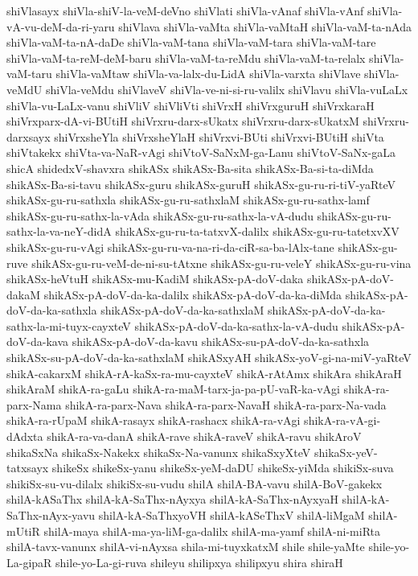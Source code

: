 {shiVlasayx
shiVla-shiV-la-veM-deVno
shiVlati
shiVla-vAnaf
shiVla-vAnf
shiVla-vA-vu-deM-da-ri-yaru
shiVlava
shiVla-vaMta
shiVla-vaMtaH
shiVla-vaM-ta-nAda
shiVla-vaM-ta-nA-daDe
shiVla-vaM-tana
shiVla-vaM-tara
shiVla-vaM-tare
shiVla-vaM-ta-reM-deM-baru
shiVla-vaM-ta-reMdu
shiVla-vaM-ta-relalx
shiVla-vaM-taru
shiVla-vaMtaw
shiVla-va-lalx-du-LidA
shiVla-varxta
shiVlave
shiVla-veMdU
shiVla-veMdu
shiVlaveV
shiVla-ve-ni-si-ru-valilx
shiVlavu
shiVla-vuLaLx
shiVla-vu-LaLx-vanu
shiVliV
shiVliVti
shiVrxH
shiVrxguruH
shiVrxkaraH
shiVrxparx-dA-vi-BUtiH
shiVrxru-darx-sUkatx
shiVrxru-darx-sUkatxM
shiVrxru-darxsayx
shiVrxsheYla
shiVrxsheYlaH
shiVrxvi-BUti
shiVrxvi-BUtiH
shiVta
shiVtakekx
shiVta-va-NaR-vAgi
shiVtoV-SaNxM-ga-Lanu
shiVtoV-SaNx-gaLa
shicA
shidedxV-shavxra
shikASx
shikASx-Ba-sita
shikASx-Ba-si-ta-diMda
shikASx-Ba-si-tavu
shikASx-guru
shikASx-guruH
shikASx-gu-ru-ri-tiV-yaRteV
shikASx-gu-ru-sathxla
shikASx-gu-ru-sathxlaM
shikASx-gu-ru-sathx-lamf
shikASx-gu-ru-sathx-la-vAda
shikASx-gu-ru-sathx-la-vA-dudu
shikASx-gu-ru-sathx-la-va-neY-didA
shikASx-gu-ru-ta-tatxvX-dalilx
shikASx-gu-ru-tatetxvXV
shikASx-gu-ru-vAgi
shikASx-gu-ru-va-na-ri-da-ciR-sa-ba-lAlx-tane
shikASx-gu-ruve
shikASx-gu-ru-veM-de-ni-su-tAtxne
shikASx-gu-ru-veleY
shikASx-gu-ru-vina
shikASx-heVtuH
shikASx-mu-KadiM
shikASx-pA-doV-daka
shikASx-pA-doV-dakaM
shikASx-pA-doV-da-ka-dalilx
shikASx-pA-doV-da-ka-diMda
shikASx-pA-doV-da-ka-sathxla
shikASx-pA-doV-da-ka-sathxlaM
shikASx-pA-doV-da-ka-sathx-la-mi-tuyx-cayxteV
shikASx-pA-doV-da-ka-sathx-la-vA-dudu
shikASx-pA-doV-da-kava
shikASx-pA-doV-da-kavu
shikASx-su-pA-doV-da-ka-sathxla
shikASx-su-pA-doV-da-ka-sathxlaM
shikASxyAH
shikASx-yoV-gi-na-miV-yaRteV
shikA-cakarxM
shikA-rA-kaSx-ra-mu-cayxteV
shikA-rAtAmx
shikAra
shikAraH
shikAraM
shikA-ra-gaLu
shikA-ra-maM-tarx-ja-pa-pU-vaR-ka-vAgi
shikA-ra-parx-Nama
shikA-ra-parx-Nava
shikA-ra-parx-NavaH
shikA-ra-parx-Na-vada
shikA-ra-rUpaM
shikA-rasayx
shikA-rashacx
shikA-ra-vAgi
shikA-ra-vA-gi-dAdxta
shikA-ra-va-danA
shikA-rave
shikA-raveV
shikA-ravu
shikAroV
shikaSxNa
shikaSx-Nakekx
shikaSx-Na-vanunx
shikaSxyXteV
shikaSx-yeV-tatxsayx
shikeSx
shikeSx-yanu
shikeSx-yeM-daDU
shikeSx-yiMda
shikiSx-suva
shikiSx-su-vu-dilalx
shikiSx-su-vudu
shilA
shilA-BA-vavu
shilA-BoV-gakekx
shilA-kASaThx
shilA-kA-SaThx-nAyxya
shilA-kA-SaThx-nAyxyaH
shilA-kA-SaThx-nAyx-yavu
shilA-kA-SaThxyoVH
shilA-kASeThxV
shilA-liMgaM
shilA-mUtiR
shilA-maya
shilA-ma-ya-liM-ga-dalilx
shilA-ma-yamf
shilA-ni-miRta
shilA-tavx-vanunx
shilA-vi-nAyxsa
shila-mi-tuyxkatxM
shile
shile-yaMte
shile-yo-La-gipaR
shile-yo-La-gi-ruva
shileyu
shilipxya
shilipxyu
shira
shiraH
}
